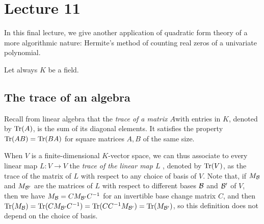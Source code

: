 \documentclass[12pt, leqno, british]{amsart}
\author{Nicolas Daans}
\begin{document}
\section{Lecture 11}
In this final lecture, we give another application of quadratic form theory of a more algorithmic nature: Hermite's method of counting real zeros of a univariate polynomial.

Let always $K$ be a field.

\subsection{The trace of an algebra}
Recall from linear algebra that the \emph{trace of a matrix $A$}with entries in $K$, denoted by $\operatorname{Tr}(A)$, is the sum of its diagonal elements.
It satisfies the property $\operatorname{Tr}(AB) = \operatorname{Tr}(BA)$ for square matrices $A, B$ of the same size.

When $V$ is a finite-dimensional $K$-vector space, we can thus associate to every linear map $L : V \to V$ the \emph{trace of the linear map $L$} , denoted by $\operatorname{Tr}(V)$, as the trace of the matrix of $L$ with respect to any choice of basis of $V$.
Note that, if $M_{\mathcal{B}}$ and $M_{\mathcal{B}'}$ are the matrices of $L$ with respect to different bases $\mathcal{B}$ and $\mathcal{B}'$ of $V$, then we have $M_{\mathcal{B}} = CM_{\mathcal{B}'}C^{-1}$ for an invertible base change matrix $C$, and then $\operatorname{Tr}(M_{\mathcal{B}}) = \operatorname{Tr}(CM_{\mathcal{B}'}C^{-1}) = \operatorname{Tr}(CC^{-1}M_{\mathcal{B}'}) = \operatorname{Tr}(M_{\mathcal{B}'})$, so this definition does not depend on the choice of basis.
\end{document}
